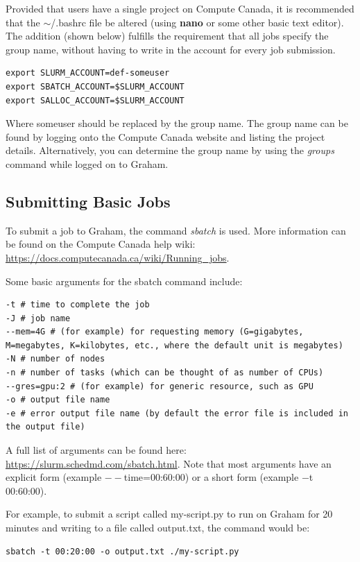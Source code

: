\documentclass[12pt]{article}
\begin{document}
\quad Provided that users have a single project on Compute Canada, it is recommended that the $\sim$/.bashrc file be altered (using \textbf{nano} or some other basic text editor). The addition (shown below) fulfills the requirement that all jobs specify the group name, without having to write in the account for every job submission.

\begin{lstlisting}[numbers=none]
export SLURM_ACCOUNT=def-someuser
export SBATCH_ACCOUNT=$SLURM_ACCOUNT
export SALLOC_ACCOUNT=$SLURM_ACCOUNT 
\end{lstlisting}

Where someuser should be replaced by the group name. The group name can be found by logging onto the Compute Canada website and listing the project details. Alternatively, you can determine the group name by using the \textit{groups} command while logged on to Graham.



\subsection{Submitting Basic Jobs}
\quad\enskip\quad To submit a job to Graham, the command \textit{sbatch} is used. More information can be found on the Compute Canada help wiki: \url{https://docs.computecanada.ca/wiki/Running_jobs}.

\quad Some basic arguments for the sbatch command include:
\begin{lstlisting}[numbers=none, basicstyle=\normalsize]
-t # time to complete the job
-J # job name
--mem=4G # (for example) for requesting memory (G=gigabytes, M=megabytes, K=kilobytes, etc., where the default unit is megabytes) 
-N # number of nodes
-n # number of tasks (which can be thought of as number of CPUs) 
--gres=gpu:2 # (for example) for generic resource, such as GPU
-o # output file name
-e # error output file name (by default the error file is included in the output file)
\end{lstlisting}
 A full list of arguments can be found here: \url{https://slurm.schedmd.com/sbatch.html}. Note that most arguments have an explicit form (example $--$time=00:60:00) or a short form (example $-$t 00:60:00). 
 
\quad For example, to submit a script called my-script.py to run on Graham for 20 minutes and writing to a file called output.txt, the command would be: 
\begin{lstlisting}[numbers=none, basicstyle=\normalsize]
sbatch -t 00:20:00 -o output.txt ./my-script.py
\end{lstlisting}
\end{document}
